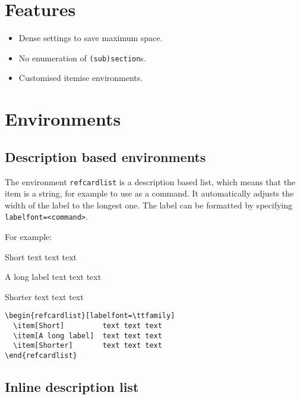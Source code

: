 \documentclass[   %
  final,          %
  a4paper,        %
  columns=3,       %
  margin=1.0cm,   %
]{refcard}
\begin{document}
\section{Features}

\begin{itemize}
\item Dense settings to save maximum space.
\item No enumeration of \lstinline`(sub)section`s.
\item Customised itemise environments.
\end{itemize}

\section{Environments}

\subsection{Description based environments}

The environment \lstinline`refcardlist` is a description based list,
which means that the item is a string, for example to use as a command.
It automatically adjusts the width of the label to the longest one.
The label can be formatted by specifying \lstinline`labelfont=<command>`.

For example:
\begin{refcardlist}[labelfont=\ttfamily]
  \item[Short]         text text text
  \item[A long label]  text text text
  \item[Shorter]       text text text
\end{refcardlist}

\begin{lstlisting}
\begin{refcardlist}[labelfont=\ttfamily]
  \item[Short]         text text text
  \item[A long label]  text text text
  \item[Shorter]       text text text
\end{refcardlist}
\end{lstlisting}

\subsection{Inline description list}
\end{document}

